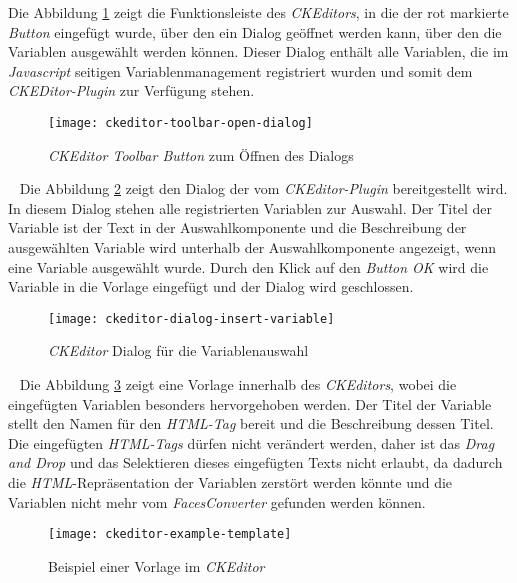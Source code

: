 \newline
\newline
Die Abbildung \ref{fig:ckeditor-toolbar-opne-dialog} zeigt die Funktionsleiste des \emph{CKEditors}, in die der rot markierte \emph{Button} eingefügt wurde, über den ein Dialog geöffnet werden kann, über den die Variablen ausgewählt werden können. Dieser Dialog enthält alle Variablen, die im \emph{Javascript} seitigen Variablenmanagement registriert wurden und somit dem \emph{CKEDitor-Plugin} zur Verfügung stehen.
\begin{figure}[h]
\centering
\texttt{[image: ckeditor-toolbar-open-dialog]}
\caption{\emph{CKEditor Toolbar Button} zum Öffnen des Dialogs}
\label{fig:ckeditor-toolbar-opne-dialog}
\end{figure}
\ \newline
Die Abbildung \ref{fig:ckeditor-dialog-insert-variable} zeigt den Dialog der vom \emph{CKEditor-Plugin} bereitgestellt wird. In diesem Dialog stehen alle registrierten Variablen zur Auswahl. Der Titel der Variable ist der Text in der Auswahlkomponente und die Beschreibung der ausgewählten Variable wird unterhalb der Auswahlkomponente angezeigt, wenn eine Variable ausgewählt wurde. Durch den Klick auf den \emph{Button OK} wird die Variable in die Vorlage eingefügt und der Dialog wird geschlossen.
\begin{figure}[h]
\centering
\texttt{[image: ckeditor-dialog-insert-variable]}
\caption{\emph{CKEditor} Dialog für die Variablenauswahl}
\label{fig:ckeditor-dialog-insert-variable}
\end{figure}
\ \newline
Die Abbildung \ref{fig:ckeditor-example-template} zeigt eine Vorlage innerhalb des \emph{CKEditors}, wobei die eingefügten Variablen besonders hervorgehoben werden. Der Titel der Variable stellt den Namen für den \emph{HTML-Tag} bereit und die Beschreibung dessen Titel. Die eingefügten \emph{HTML-Tags} dürfen nicht verändert werden, daher ist das \emph{Drag and Drop} und das Selektieren dieses eingefügten Texts nicht erlaubt, da dadurch die \emph{HTML}-Repräsentation der Variablen zerstört werden könnte und die Variablen nicht mehr vom \emph{FacesConverter} gefunden werden können.
\begin{figure}[h]
\centering
\texttt{[image: ckeditor-example-template]}
\caption{Beispiel einer Vorlage im \emph{CKEditor}}
\label{fig:ckeditor-example-template}
\end{figure}
\newpage

